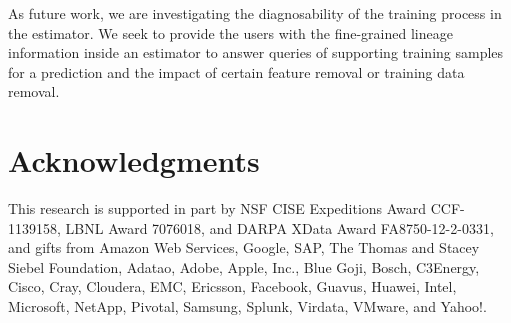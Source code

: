 \documentclass{sig-alternate}
\begin{document}
As future work, we are investigating the diagnosability of the training process in the estimator. We seek to provide the users with
the fine-grained lineage information inside an estimator to answer queries of supporting training samples for
a prediction and the impact of certain feature removal or training data removal.

\section{Acknowledgments}
This research is supported in part by NSF CISE Expeditions Award CCF-1139158, LBNL Award 7076018, and DARPA XData Award FA8750-12-2-0331, and gifts from Amazon Web Services, Google, SAP,  The Thomas and Stacey Siebel Foundation, Adatao, Adobe, Apple, Inc., Blue Goji, Bosch, C3Energy, Cisco, Cray, Cloudera, EMC, Ericsson, Facebook, Guavus, Huawei, Intel, Microsoft, NetApp, Pivotal, Samsung, Splunk, Virdata, VMware, and Yahoo!. 

%

%
%



\balancecolumns

\end{document}

